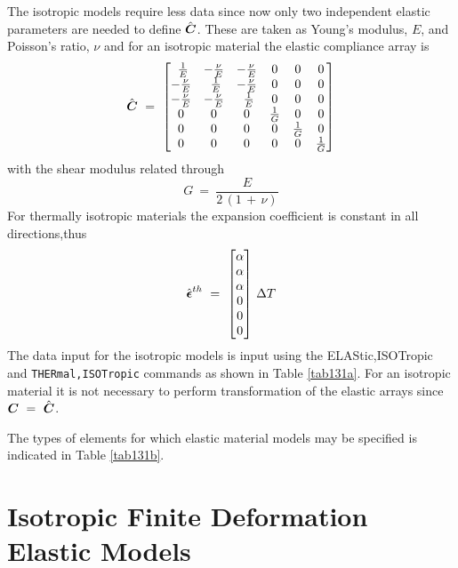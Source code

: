 The isotropic models require less data since now only two independent
elastic parameters are needed to define $\hat{\boldsymbol{C}}$. These are
taken as Young's modulus, $E$, and Poisson's ratio, $\nu$ and
for an isotropic material the elastic compliance array is
\begin{equation}
\hat{\boldsymbol{C}} ~=~ \left[
\begin{matrix}
~\frac{1}{E} & - \frac{\nu}{E} & - \frac{\nu}{E} & 0 & 0 & 0 \\
- \frac{\nu}{E} & ~\frac{1}{E} & - \frac{\nu}{E} & 0 & 0 & 0 \\
- \frac{\nu}{E} & - \frac{\nu}{E} & ~\frac{1}{E} & 0 & 0 & 0 \\
0 & 0 & 0 & \frac{1}{G} & 0 & 0 \\
0 & 0 & 0 & 0 & \frac{1}{G} & 0 \\
0 & 0 &0 & 0 & 0 & \frac{1}{G} \\
\end{matrix} \right]
\end{equation}
with the shear modulus related through
\begin{equation}
G ~=~ \frac{E}{2 \, (1 \,+ \, \nu)}
\end{equation}
For thermally isotropic materials the expansion coefficient is constant in
all directions,thus
\begin{equation}
\hat{\boldsymbol{\epsilon}}^{th} ~=~ \left[ \begin{matrix}
\alpha \\ \alpha \\ \alpha \\ 0 \\ 0 \\ 0 \\
\end{matrix} \right]
\, \Delta T
\end{equation}
The data input for the isotropic models is input using
the {ELASt\-ic,ISOTrop\-ic}
and {\tt THERm\-al,ISOTrop\-ic} commands as shown in Table \ref{tab131a}.
For an isotropic material it is not necessary to perform transformation of
the elastic arrays since $\boldsymbol{C} ~=~ \hat{\boldsymbol{C}}$.

The types of elements for which elastic material models may be specified
is indicated in Table \ref{tab131b}.

\section{Isotropic Finite Deformation Elastic Models}
\label{isofel}

